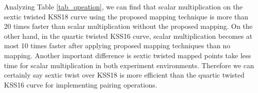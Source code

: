 \renewcommand{\baselinestretch}{1.5}
\begin{table*}
\centering
\caption{ Comparative result of average execution time in [ms] for scalar multiplication}
\label{tab_opeation}
\end{table*}
\renewcommand{\baselinestretch}{1.0}

Analyzing  Table \ref{tab_opeation}, we can find that scalar multiplication on the sextic twisted KSS18 curve using the proposed  mapping technique is more than 20 times faster than scalar multiplication without the proposed mapping. 
On the other hand, in the quartic twisted KSS16 curve, scalar multiplication becomes at most 10 times faster after applying proposed mapping techniques than no mapping. 
Another important difference is sextic twisted mapped points take less  time for scalar multiplication in both experiment environments. Therefore we can certainly say sextic twist over KSS18 is more efficient than the quartic twisted KSS16 curve for implementing  pairing operations.


